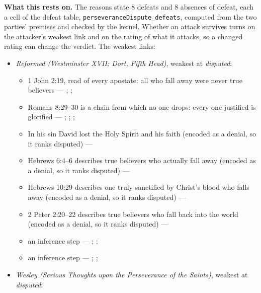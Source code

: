 \documentclass[11pt]{article}
\begin{document}
\par\noindent\textbf{What this rests on.} The reasons state 8 defeats and 8 absences of defeat, each a cell of the defeat table, \texttt{perseverance\allowbreak{}Dispute\_\allowbreak{}defeats}, computed from the two parties' premises and checked by the kernel. Whether an attack survives turns on the attacker's weakest link and on the rating of what it attacks, so a changed rating can change the verdict. The weakest links:
\begin{itemize}
\item \emph{Reformed (Westminster XVII; Dort, Fifth Head)}, weakest at \emph{disputed}:
\begin{itemize}
\item 1 John 2:19, read of every apostate: all who fall away were never true believers --- \cite[594--595]{owen-works-11-perseverance}; \cite[191--192]{calvin-commentaries-catholic-epistles}; \cite[479--480]{npnf1-05-1887}
\item Romans 8:29–30 is a chain from which no one drops: every one justified is glorified --- \cite[582--583]{schaff-creeds-christendom-3-1977}; \cite[557]{schaff-creeds-christendom-3-1977}; \cite[384]{wesley-explanatory-notes-nt}; \cite[413]{wesley-works-9-1827}
\item In his sin David lost the Holy Spirit and his faith (encoded as a denial, so it ranks disputed) --- \cite[299--300]{calvin-psalms-2-1846}
\item Hebrews 6:4–6 describes true believers who actually fall away (encoded as a denial, so it ranks disputed) --- \cite[137--138]{calvin-hebrews-1853}
\item Hebrews 10:29 describes one truly sanctified by Christ’s blood who falls away (encoded as a denial, so it ranks disputed) --- \cite[545--546]{owen-works-23-1855}
\item 2 Peter 2:20–22 describes true believers who fall back into the world (encoded as a denial, so it ranks disputed) --- \cite[410--412]{calvin-commentaries-catholic-epistles}
\item an inference step --- \cite[444--445]{wesley-works-9-1827}; \cite[415--416]{calvin-commentary-john-1847}; \cite[Solid Declaration XI.45]{concordia-triglotta-1921}
\item an inference step --- \cite[Trent, Session VI (1547), ch. 13]{tanner-decrees-1990}; \cite[40]{waterworth-trent-1848}; \cite[Solid Declaration XI.42]{concordia-triglotta-1921}
\end{itemize}
\item \emph{Wesley (Serious Thoughts upon the Perseverance of the Saints)}, weakest at \emph{disputed}:

\end{itemize}
\end{document}
